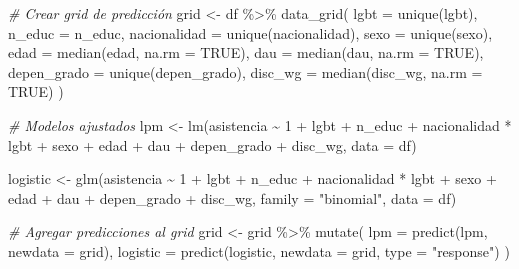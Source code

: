 \documentclass[
  12pt,
  a4paper,
]{article}
\newenvironment{Shaded}{\begin{snugshade}}{\end{snugshade}}
\newcommand{\AttributeTok}[1]{\textcolor[rgb]{0.77,0.63,0.00}{#1}}
\newcommand{\CommentTok}[1]{\textcolor[rgb]{0.56,0.35,0.01}{\textit{#1}}}
\newcommand{\ConstantTok}[1]{\textcolor[rgb]{0.00,0.00,0.00}{#1}}
\newcommand{\DecValTok}[1]{\textcolor[rgb]{0.00,0.00,0.81}{#1}}
\newcommand{\FunctionTok}[1]{\textcolor[rgb]{0.00,0.00,0.00}{#1}}
\newcommand{\NormalTok}[1]{#1}
\newcommand{\OtherTok}[1]{\textcolor[rgb]{0.56,0.35,0.01}{#1}}
\newcommand{\SpecialCharTok}[1]{\textcolor[rgb]{0.00,0.00,0.00}{#1}}
\newcommand{\StringTok}[1]{\textcolor[rgb]{0.31,0.60,0.02}{#1}}
\begin{document}
\begin{Shaded}
\begin{Highlighting}[]
  \CommentTok{\# Crear grid de predicción}
\NormalTok{  grid }\OtherTok{\textless{}{-}}\NormalTok{ df }\SpecialCharTok{\%\textgreater{}\%}
    \FunctionTok{data\_grid}\NormalTok{(}
      \AttributeTok{lgbt =} \FunctionTok{unique}\NormalTok{(lgbt),}
      \AttributeTok{n\_educ =}\NormalTok{ n\_educ,}
      \AttributeTok{nacionalidad =} \FunctionTok{unique}\NormalTok{(nacionalidad),}
      \AttributeTok{sexo =} \FunctionTok{unique}\NormalTok{(sexo),}
      \AttributeTok{edad =} \FunctionTok{median}\NormalTok{(edad, }\AttributeTok{na.rm =} \ConstantTok{TRUE}\NormalTok{),}
      \AttributeTok{dau =} \FunctionTok{median}\NormalTok{(dau, }\AttributeTok{na.rm =} \ConstantTok{TRUE}\NormalTok{),}
      \AttributeTok{depen\_grado =} \FunctionTok{unique}\NormalTok{(depen\_grado),}
      \AttributeTok{disc\_wg =} \FunctionTok{median}\NormalTok{(disc\_wg, }\AttributeTok{na.rm =} \ConstantTok{TRUE}\NormalTok{)}
\NormalTok{    )}
  
  \CommentTok{\# Modelos ajustados}
\NormalTok{  lpm }\OtherTok{\textless{}{-}} \FunctionTok{lm}\NormalTok{(asistencia }\SpecialCharTok{\textasciitilde{}} \DecValTok{1} \SpecialCharTok{+}\NormalTok{ lgbt }\SpecialCharTok{+}\NormalTok{ n\_educ }\SpecialCharTok{+}\NormalTok{ nacionalidad }\SpecialCharTok{*}\NormalTok{ lgbt }\SpecialCharTok{+}\NormalTok{ sexo }\SpecialCharTok{+}\NormalTok{ edad }\SpecialCharTok{+}\NormalTok{ dau }\SpecialCharTok{+}\NormalTok{ depen\_grado }\SpecialCharTok{+}\NormalTok{ disc\_wg, }\AttributeTok{data =}\NormalTok{ df)}
  
\NormalTok{  logistic }\OtherTok{\textless{}{-}} \FunctionTok{glm}\NormalTok{(asistencia }\SpecialCharTok{\textasciitilde{}} \DecValTok{1} \SpecialCharTok{+}\NormalTok{ lgbt }\SpecialCharTok{+}\NormalTok{ n\_educ }\SpecialCharTok{+}\NormalTok{ nacionalidad }\SpecialCharTok{*}\NormalTok{ lgbt }\SpecialCharTok{+}\NormalTok{ sexo }\SpecialCharTok{+}\NormalTok{ edad }\SpecialCharTok{+}\NormalTok{ dau }\SpecialCharTok{+}\NormalTok{ depen\_grado }\SpecialCharTok{+}\NormalTok{ disc\_wg, }
                  \AttributeTok{family =} \StringTok{"binomial"}\NormalTok{, }\AttributeTok{data =}\NormalTok{ df)}
  
  \CommentTok{\# Agregar predicciones al grid}
\NormalTok{  grid }\OtherTok{\textless{}{-}}\NormalTok{ grid }\SpecialCharTok{\%\textgreater{}\%}
    \FunctionTok{mutate}\NormalTok{(}
      \AttributeTok{lpm =} \FunctionTok{predict}\NormalTok{(lpm, }\AttributeTok{newdata =}\NormalTok{ grid),}
      \AttributeTok{logistic =} \FunctionTok{predict}\NormalTok{(logistic, }\AttributeTok{newdata =}\NormalTok{ grid, }\AttributeTok{type =} \StringTok{"response"}\NormalTok{)}
\NormalTok{    )}
  

\end{Highlighting}
\end{Shaded}
\end{document}
